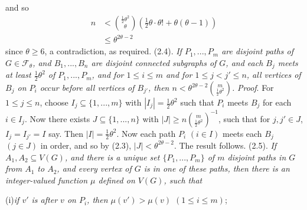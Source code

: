 \noindent and so
\begin{align*}
n&<\binom{\frac12\theta^2}{\theta}(\tfrac12\theta\cdot\theta!+\theta(\theta-1))\\
&\le\theta^{2\theta-2}
\end{align*}
since $\theta\ge 6$, a contradiction, as required.
\stmt
(2.4). \textit{If $P_1,..., P_m$ are disjoint paths of $G\in\mathscr{F}_\theta$, and $B_1,..., B_n$ are disjoint
connected subgraphs of $G$, and each $B_j$ meets at least $\frac12\theta^2$ of $P_1,..., P_m$, and
for $1\le i\le m$ and for $1\le j<j'\le n$, all vertices of $B_j$ on $P_i$ occur before all
vertices of $B_{j'}$, then $n<\theta^{2\theta-2}\binom{m}{\frac12\theta^2}$.}
\stmt
\textit{Proof}. For $1\le j\le n$, choose $I_j\subseteq\{1,..., m\}$ with $|I_j|=\frac12\theta^2$ such that $P_i$
meets $B_j$ for each $i\in I_j$. Now there exists $J\subseteq\{1,..., n\}$ with $|J|\ge n\binom{m}{\frac12\theta^2}^{-1}$,
such that for $j, j'\in J$, $I_j=I_{j'}=I$ say. Then $|I|=\frac12\theta^2$. Now each path $P_i$
$(i\in I)$ meets each $B_j$ $(j\in J)$ in order, and so by (2.3), $|J|<\theta^{2\theta-2}$. The result
follows.
\stmt
(2.5). \textit{If $A_1, A_2\subseteq V(G)$, and there is a unique set $\{P_1,..., P_m\}$ of $m$ disjoint
paths in $G$ from $A_1$ to $A_2$, and every vertex of $G$ is in one of these paths, then
there is an integer-valued function $\mu$ defined on $V(G)$, such that}

\hspace*{12pt}(i)\enspace\textit{if $v'$ is after $v$ on $P_i$, then $\mu(v')>\mu(v)$ $(1\le i\le m)$};

